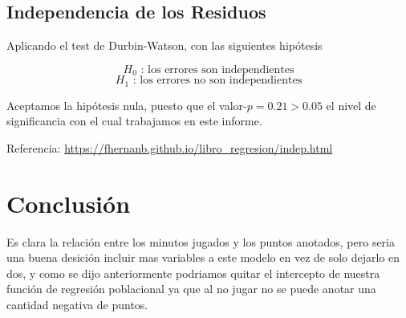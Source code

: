 \documentclass[onecolumn]{IEEEtran}
\begin{document}
    \subsection{Independencia de los Residuos}

    Aplicando el test de Durbin-Watson, con las siguientes hip\'otesis
    
    $$
        H_0\text{ : los errores son independientes}
    $$
    $$
        H_1\text{ : los errores no son independientes}
    $$

    Aceptamos la hip\'otesis nula, puesto que el valor-$p = 0.21 > 0.05$ el nivel de significancia con el cual trabajamos en este informe. 

    Referencia: \url{https://fhernanb.github.io/libro_regresion/indep.html}

    \section{Conclusi\'on}
    Es clara la relaci\'on entre los minutos jugados y los puntos anotados, pero seria una buena desici\'on incluir mas variables a este modelo en vez de solo dejarlo en dos, y como se dijo anteriormente podriamos quitar el intercepto de nuestra funci\'on de regresi\'on poblacional ya que al no jugar no se puede anotar una cantidad negativa de puntos.
\end{document}
